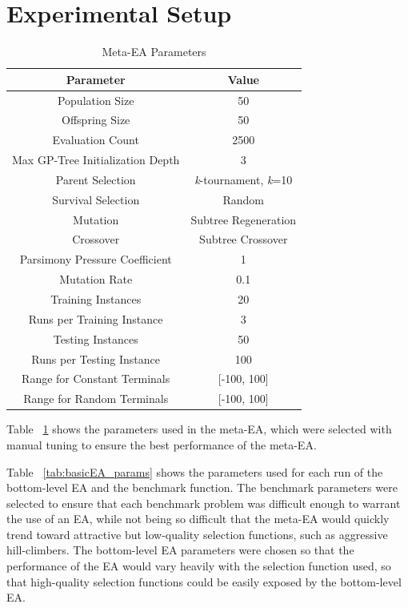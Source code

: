 \documentclass[sigconf]{acmart}
\begin{document}
\section{Experimental Setup}
\label{Experimental Setup}

\begin{table}
  \caption{Meta-EA Parameters}
  \label{tab:meta-EA_params}
  \begin{tabular}{cc}
    \toprule
    Parameter& Value\\
    \midrule
    Population Size & 50 \\
    Offspring Size & 50\\
    Evaluation Count & 2500\\
    Max GP-Tree Initialization Depth & 3\\
    Parent Selection & \textit{k}-tournament, \textit{k}=10 \\
    Survival Selection & Random\\
    Mutation & Subtree Regeneration\\
    Crossover & Subtree Crossover\\
    Parsimony Pressure Coefficient & 1\\
    Mutation Rate & 0.1\\
    Training Instances & 20 \\
    Runs per Training Instance & 3 \\
    Testing Instances & 50 \\
    Runs per Testing Instance & 100 \\
    Range for Constant Terminals & [-100, 100]\\
    Range for Random Terminals & [-100, 100]\\
    
  \bottomrule
\end{tabular}
\end{table}

Table ~\ref{tab:meta-EA_params} shows the parameters used in the meta-EA, which were selected with manual tuning to ensure the best performance of the meta-EA. 

Table ~\ref{tab:basicEA_params} shows the parameters used for each run of the bottom-level EA and the benchmark function. The benchmark parameters were selected to ensure that each benchmark problem was difficult enough to warrant the use of an EA, while not being so difficult that the meta-EA would quickly trend toward attractive but low-quality selection functions, such as aggressive hill-climbers. The bottom-level EA parameters were chosen so that the performance of the EA would vary heavily with the selection function used, so that high-quality selection functions could be easily exposed by the bottom-level EA.
\end{document}
